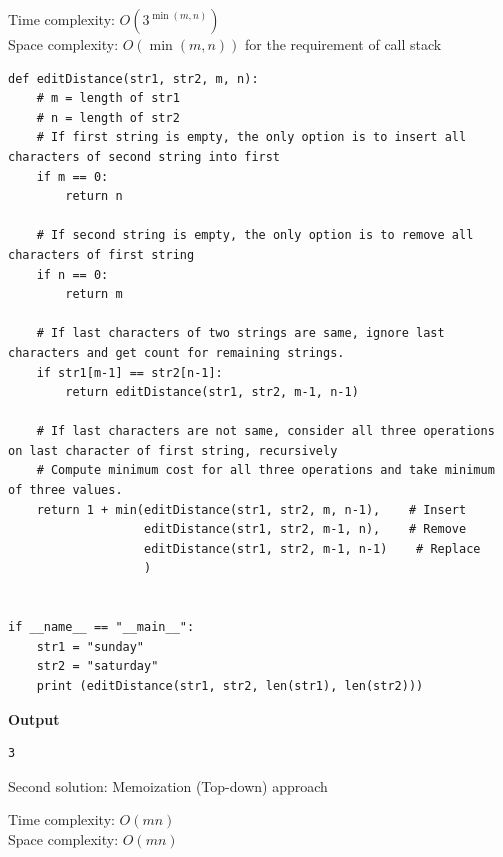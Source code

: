 \documentclass[a4paper,11pt]{book}
\begin{document}
\noindent Time complexity: $O(3^{\min(m,n)})$\\
\noindent Space complexity: $O(\min(m,n))$ for the requirement of call stack


\begin{lstlisting}
def editDistance(str1, str2, m, n):
    # m = length of str1
    # n = length of str2
    # If first string is empty, the only option is to insert all characters of second string into first
    if m == 0:
        return n
 
    # If second string is empty, the only option is to remove all characters of first string
    if n == 0:
        return m
    
    # If last characters of two strings are same, ignore last characters and get count for remaining strings.
    if str1[m-1] == str2[n-1]:
        return editDistance(str1, str2, m-1, n-1)
 
    # If last characters are not same, consider all three operations on last character of first string, recursively
    # Compute minimum cost for all three operations and take minimum of three values.
    return 1 + min(editDistance(str1, str2, m, n-1),    # Insert
                   editDistance(str1, str2, m-1, n),    # Remove
                   editDistance(str1, str2, m-1, n-1)    # Replace
                   )
 
 
if __name__ == "__main__":
    str1 = "sunday"
    str2 = "saturday"
    print (editDistance(str1, str2, len(str1), len(str2)))
\end{lstlisting}
\textbf{Output}
\begin{lstlisting}
3
\end{lstlisting}

\noindent Second solution: Memoization (Top-down) approach 

\noindent Time complexity: $O(mn)$\\
\noindent Space complexity: $O(mn)$ 
\end{document}
